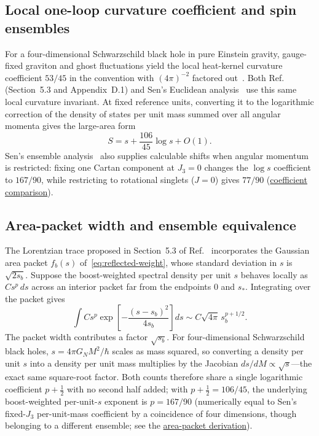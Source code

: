 \documentclass[10pt,a4paper]{article}
\numberwithin{equation}{section}
\newcommand{\repo}[2]{\href{https://github.com/sprajs/quantum-gravity/blob/main/#1}{#2}}
\begin{document}
\subsection{Local one-loop curvature coefficient and spin ensembles}

For a four-dimensional Schwarzschild black hole in pure Einstein gravity, gauge-fixed graviton and ghost fluctuations yield the local heat-kernel curvature coefficient $53/45$ in the convention with $(4\pi)^{-2}$ factored out~\cite{BastianelliBonezziMelis2022,Sen2013}.
Both Ref.~\cite{Chandrasekaran2026} (Section~5.3 and Appendix~D.1) and Sen's Euclidean analysis~\cite{Sen2013} use this same local curvature invariant.
At fixed reference units, converting it to the logarithmic correction of the density of states per unit mass summed over all angular momenta gives the large-area form
\begin{equation}
  S = s + \frac{106}{45}\log s + O(1).
  \label{eq:sen-entropy}
\end{equation}
Sen's ensemble analysis~\cite{Sen2013} also supplies calculable shifts when angular momentum is restricted: fixing one Cartan component at $J_3=0$ changes the $\log s$ coefficient to $167/90$, while restricting to rotational singlets ($J=0$) gives $77/90$ (\repo{audit/sen.md}{coefficient comparison}).

\subsection{Area-packet width and ensemble equivalence}

The Lorentzian trace proposed in Section~5.3 of Ref.~\cite{Chandrasekaran2026} incorporates the Gaussian area packet $f_b(s)$ of~\eqref{eq:reflected-weight}, whose standard deviation in $s$ is $\sqrt{2s_b}$.
Suppose the boost-weighted spectral density per unit $s$ behaves locally as $C s^p\,ds$ across an interior packet far from the endpoints $0$ and $s_*$.
Integrating over the packet gives
\begin{equation}
  \int C s^p \exp\!\left[-\frac{(s-s_b)^2}{4s_b}\right] ds
  \sim C\sqrt{4\pi}\, s_b^{p+1/2}.
  \label{eq:packet-integral}
\end{equation}
The packet width contributes a factor $\sqrt{s_b}$.
For four-dimensional Schwarzschild black holes, $s=4\pi G_N M^2/\hbar$ scales as mass squared, so converting a density per unit $s$ into a density per unit mass multiplies by the Jacobian $ds/dM \propto \sqrt{s}$---the exact same square-root factor.
Both counts therefore share a single logarithmic coefficient $p+\tfrac{1}{2}$ with no second half added; with $p+\tfrac{1}{2}=106/45$, the underlying boost-weighted per-unit-$s$ exponent is $p=167/90$ (numerically equal to Sen's fixed-$J_3$ per-unit-mass coefficient by a coincidence of four dimensions, though belonging to a different ensemble; see the \repo{audit/ensemble-crosscheck.md}{area-packet derivation}).
\end{document}
